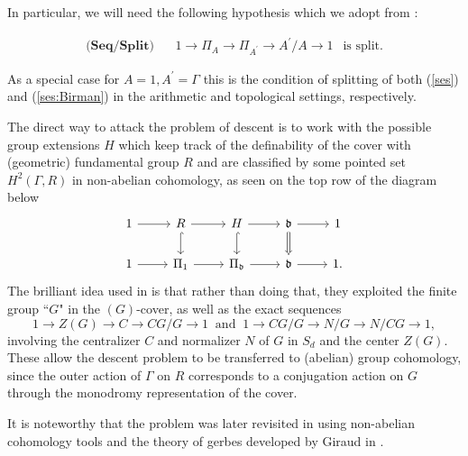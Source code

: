 \documentclass[10pt]{amsart}
\theoremstyle{definition}
\begin{document}
In particular, we will need the following hypothesis which we adopt from \cite{DebesDouai97}:

\begin{align*}
    \textbf{(Seq/Split)} \ \ \ \ & 1\to\Pi_{A} \to \Pi_{A^\prime}\to A^\prime/A\to 1 \ \  \textrm{ is split.}
\end{align*}
\vspace{0.01cm}

As a special case for $A=1, A^\prime = \mathfrak{\Gamma}$ this is the condition of splitting of both (\ref{ses}) and (\ref{ses:Birman}) in the arithmetic and topological settings, respectively.

The direct way to attack the problem of descent is to work with the possible group extensions $H$ which keep track of the definability of the cover with (geometric) fundamental group $R$ and are classified by some pointed set $H^2(\mathfrak{\Gamma},R)$ in non-abelian cohomology, as seen on the top row of the diagram below
\[\begin{tikzcd}
1 \arrow[r] & R \arrow[r] \arrow[d, hook] & H \arrow[r] \arrow[d, hook]       & \mathfrak{\Gamma} \arrow[r] \arrow[d, no head, Rightarrow] & 1 \\
1 \arrow[r] & \Pi_1 \arrow[r]             & \Pi_{\mathfrak{\Gamma}} \arrow[r] & \mathfrak{\Gamma} \arrow[r]                                & 1.
\end{tikzcd}\]  
The brilliant idea used in \cite{DebesDouai97} is that rather than doing that, 
they exploited the finite group “$G$" in the $(G)$-cover, as well as the exact sequences
\[1\rightarrow Z(G)\rightarrow C\rightarrow CG/G\rightarrow 1 \ \text{ and } \  1 \rightarrow CG/G\rightarrow N/G \rightarrow N/CG\rightarrow 1,\]
involving the centralizer $C$ and normalizer $N$ of $G$ in $S_d$ and the center $Z(G)$. These allow the descent problem to be transferred to (abelian) group cohomology, since the outer action of $\mathfrak{\Gamma}$ on $R$ corresponds to a conjugation action on $G$ through the monodromy representation of the cover.

It is noteworthy that the problem was later revisited in \cite{MR1671938} using non-abelian cohomology tools and the theory of gerbes developed by Giraud in \cite{MR344253}.
\end{document}
